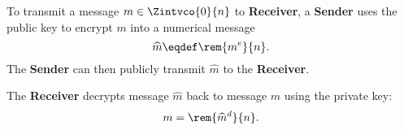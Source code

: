 \documentclass[handout]{mcs}
\begin{document}
{{\begin{description}
\begin{enumerate}
\end{enumerate}

\item[Encoding]

To transmit a message $m \in \Zintvco{0}{n}$ to \textbf{Receiver}, a
\textbf{Sender} uses the public key to encrypt $m$ into a numerical
message
\[
\widehat{m} \eqdef \rem{m^e}{n}.
\]
The \textbf{Sender} can then publicly transmit $\widehat{m}$ to the
\textbf{Receiver}.

\item[Decoding] The \textbf{Receiver} decrypts message $\widehat{m}$
  back to message $m$ using the private key:
\[
m = \rem{\widehat{m}^d}{n}.
\]

\end{description}
}}
\end{document}
